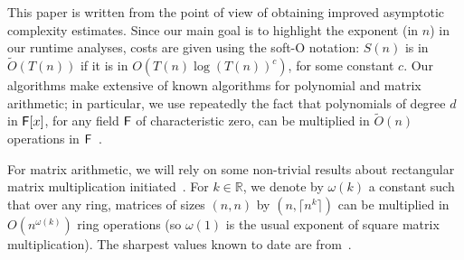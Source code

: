 This paper is written from the point of view of obtaining improved
asymptotic complexity estimates. Since our main goal is to highlight the
exponent (in $n$) in our runtime analyses, costs are given using the soft-O
notation: $S(n)$ is in $\tilde{O}(T(n))$ if it is in
$O(T(n) \log(T(n))^c)$, for some constant $c$. Our algorithms make
extensive of known algorithms for polynomial and matrix arithmetic; in
particular, we use repeatedly the fact that polynomials of degree $d$ in
${\mathsf{F}}[x]$, for any field ${\mathsf{F}}$ of characteristic zero, can be multiplied in
$\tilde{O}(n)$ operations in ${\mathsf{F}}$~\cite{ScSt71}.

For matrix arithmetic, we will rely on some non-trivial results about
rectangular matrix multiplication initiated~\cite{LoRo83}. For $k \in
\mathbb{R}$, we denote by $\omega(k)$ a constant such that over any
ring, matrices of sizes $(n,n)$ by $(n,\lceil n^k \rceil)$ can be
multiplied in $O(n^{\omega(k)})$ ring operations (so $\omega(1)$ is
the usual exponent of square matrix multiplication).  The sharpest
values known to date are from~\cite{LeGall}.

